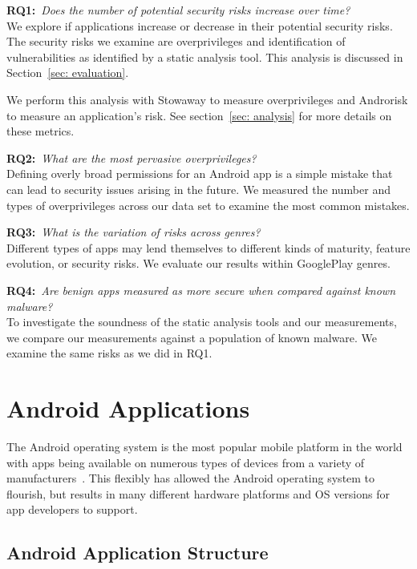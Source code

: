 \documentclass[conference]{IEEEtran}
\begin{document}
\textbf{RQ1:}~\emph{Does the number of potential security risks increase over time?}\\
We explore if applications increase or decrease in their potential security risks. The security risks we examine are overprivileges and identification of vulnerabilities as identified by a static analysis tool. This analysis is discussed in Section~\ref{sec: evaluation}.

We perform this analysis with Stowaway to measure overprivileges and Androrisk to measure an application's risk. See section~\ref{sec: analysis} for more details on these metrics.


\textbf{RQ2:}~\emph{What are the most pervasive overprivileges?}\\
Defining overly broad permissions for an Android app is a simple mistake that can lead to security issues arising in the future. We measured the number and types of overprivileges across our data set to examine the most common mistakes.

\textbf{RQ3:}~\emph{What is the variation of risks across genres?}\\
Different types of apps may lend themselves to different kinds of maturity, feature evolution, or security risks. We evaluate our results within GooglePlay genres.

\textbf{RQ4:}~\emph{Are benign apps measured as more secure when compared against known malware?}\\
To investigate the soundness of the static analysis tools and our measurements, we compare our measurements against a population of known malware. We examine the same risks as we did in RQ1.



\label{sec: androidapplications}
\section{Android Applications}


The Android operating system is the most popular mobile platform in the world with apps being available on numerous types of devices from a variety of manufacturers~\cite{androidpopularity_url}. This flexibly has allowed the Android operating system to flourish, but results in many different hardware platforms and OS versions for app developers to support.

\subsection{Android Application Structure}
\end{document}
